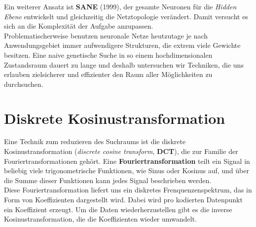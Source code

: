             \noindent
            Ein weiterer Ansatz ist \textbf{SANE}\cite{moriarty1999evolutionary} (1999), der gesamte Neuronen für die \textit{Hidden Ebene} entwickelt und gleichzeitig die Netztopologie verändert. Damit versucht es sich an die Komplexität der Aufgabe anzupassen. \\ %

            \noindent
            Problematischerweise benutzen neuronale Netze heutzutage je nach Anwendungsgebiet immer aufwendigere Strukturen, die extrem viele Gewichte besitzen. Eine naive genetische Suche in so einem hochdimensionalen Zustandsraum dauert zu lange und deshalb untersuchen wir Techniken, die uns erlauben zielsicherer und effizienter den Raum aller Möglichkeiten zu durchsuchen. 

\newpage

    \section{Diskrete Kosinustransformation} \label{dct-definition}

        Eine Technik zum reduzieren des Suchraums ist die diskrete Kosinustransformation (\textit{discrete cosine transform}, \textbf{DCT}), die zur Familie der Fouriertransformationen gehört. Eine \textbf{Fouriertransformation} teilt ein Signal in beliebig viele trigonometrische Funktionen, wie Sinus oder Kosinus auf, und über die Summe dieser Funktionen kann jedes Signal beschrieben werden. \\

        \noindent
        Diese Fouriertransformation liefert uns ein diskretes Frenquenzenspektrum, das in Form von Koeffizienten dargestellt wird. Dabei wird pro kodierten Datenpunkt ein Koeffizient erzeugt. Um die Daten wiederherzustellen gibt es die inverse Kosinustransformation, die die Koeffizienten wieder umwandelt.

